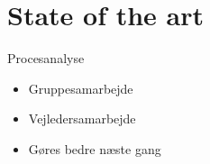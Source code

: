 \section{State of the art}
\begin{frame}{Procesanalyse}{}
\begin{itemize}
\item Gruppesamarbejde
\item Vejledersamarbejde
\item Gøres bedre næste gang
\end{itemize}
\end{frame}